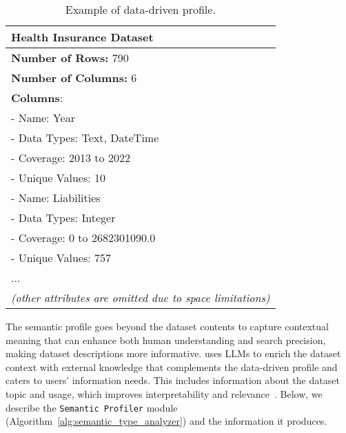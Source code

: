 \begin{table}
    \small
    \centering
    \begin{tabular}{p{7.7cm}}
    \toprule
    \textbf{Health Insurance Dataset} \\
    \midrule
    \textbf{Number of Rows:} 790\\
    \textbf{Number of Columns:} 6\\
    \textbf{Columns}:\\
    - Name: Year\\
    \hspace{5mm} - Data Types: Text, DateTime\\
    \hspace{5mm}  - Coverage: 2013 to 2022 \\
    \hspace{5mm} - Unique Values: 10\\
    - Name: Liabilities\\
    \hspace{5mm} - Data Types: Integer\\
    \hspace{5mm}  - Coverage: 0 to 2682301090.0 \\
    \hspace{5mm} - Unique Values: 757\\
    \hspace{7mm}...\\
    \emph{(other attributes are omitted due to space limitations)}\\
    \bottomrule
    \end{tabular}
    \caption{Example of data-driven profile.}
    \label{tab:examples_datadriven_profile}
    \vspace{-3.0em}
\end{table}


% 
The semantic profile goes beyond the dataset contents to capture contextual meaning that can enhance both human understanding and search precision, making dataset descriptions more informative.
% 
\SystemName uses LLMs to enrich the dataset context with external knowledge that complements the data-driven profile and  caters to users' information needs. This includes information about the dataset topic and usage, which improves interpretability and relevance~\cite{koesten2020everything}.
% 
Below, we describe the \texttt{Semantic Profiler} module (Algorithm~\ref{alg:semantic_type_analyzer}) and the information it produces.


